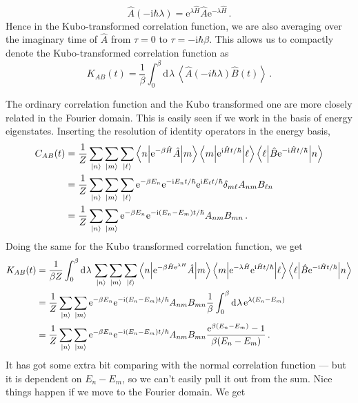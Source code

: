 \documentclass{article}
\theoremstyle{plain}\theoremheaderfont{\normalfont\itshape}\theorembodyfont{\rmfamily}\theoremseparator{.}\newtheorem*{rem}{Remark}\newtheorem*{ex}{Example}\newtheorem*{proof}{Proof}\newtheorem*{altp}{Alternative proof}
\theoremstyle{plain}\theoremheaderfont{\normalfont\bfseries}\theorembodyfont{\rmfamily}\theoremseparator{.}\newtheorem{thm}{Theorem}[section]\newtheorem{lem}[thm]{Lemma}\newtheorem{prop}[thm]{Proposition}\newtheorem*{cor}{Corollary}\newtheorem{defn}[thm]{Definition}\newtheorem{clm}[thm]{Claim}\newtheorem{clminproof}{Claim}
\theoremstyle{break}\theoremheaderfont{\normalfont\itshape}\theorembodyfont{\rmfamily}\theoremseparator{.\medskip}\newtheorem*{proofskip}{Proof}\newtheorem*{exs}{Examples}\newtheorem*{rems}{Remarks}
\theoremstyle{break}\theoremheaderfont{\normalfont\bfseries}\theorembodyfont{\rmfamily}\theoremseparator{.\medskip}\newtheorem{lemskip}[thm]{Lemma}\newtheorem{defnskip}[thm]{Definition}\newtheorem{propskip}[thm]{Proposition}\newtheorem{thmskip}[thm]{Theorem}
\numberwithin{equation}{section}
\newcommand{\ii}{\mathrm{i}}
\newcommand{\ee}{\mathrm{e}}
\newcommand{\dd}[2][]{\mathrm{d}^{#1} #2\,}
\newcommand{\ket}[1]{\left| #1 \right\rangle}
\newcommand{\mel}[3]{\left\langle #1 \middle| #2 \middle| #3 \right\rangle}
\newcommand{\eval}[1]{\left\langle #1 \right\rangle}
\begin{document}
    \begin{equation}
        \hat{A}(-\ii\hbar\lambda)=\ee^{\lambda\hat{H}}\hat{A}\ee^{-\lambda\hat{H}}\,.
    \end{equation}
    Hence in the Kubo-transformed correlation function, we are also averaging over the imaginary time of \(\hat{A}\) from \(\tau =0\) to \(\tau=-\ii\hbar\beta\). This allows us to compactly denote the Kubo-transformed correlation function as
    \begin{equation}
        K_{AB}(t)=\frac{1}{\beta}\int_{0}^{\beta}\dd{\lambda}\eval{\hat{A}(-i\hbar\lambda)\hat{B}(t)}\,.
    \end{equation}

    The ordinary correlation function and the Kubo transformed one are more closely related in the Fourier domain. This is easily seen if we work in the basis of energy eigenstates. Inserting the resolution of identity operators in the energy basis,
    \begin{align}
        C_{AB}(t)&=\frac{1}{Z}\sum_{\ket{n}}\sum_{\ket{m}}\sum_{\ket{\ell}}\mel{n}{\ee^{-\beta\hat{H}}\hat{A}}{m}\mel{m}{\ee^{\ii\hat{H}t/\hbar}}{\ell}\mel{\ell}{\hat{B}\ee^{-\ii\hat{H}t/\hbar}}{n}\notag \\
        &=\frac{1}{Z}\sum_{\ket{n}}\sum_{\ket{m}}\sum_{\ket{\ell}}\ee^{-\beta E_n}\ee^{-\ii E_n t/\hbar}\ee^{\ii E_\ell t/\hbar}\delta_{m\ell}A_{nm}B_{\ell n}\notag \\
        &=\frac{1}{Z}\sum_{\ket{n}}\sum_{\ket{m}}\ee^{-\beta E_n}\ee^{-\ii(E_n-E_m)t/\hbar}A_{nm}B_{mn}\,.
    \end{align}
    Doing the same for the Kubo transformed correlation function, we get
    \begin{align}
        K_{AB}(t)&=\frac{1}{\beta Z}\int_{0}^{\beta}\dd{\lambda}\sum_{\ket{n}}\sum_{\ket{m}}\sum_{\ket{\ell}}\mel{n}{\ee^{-\beta\hat{H}\ee^{\lambda H}}\hat{A}}{m}\mel{m}{\ee^{-\lambda\hat{H}}\ee^{\ii\hat{H}t/\hbar}}{\ell}\mel{\ell}{\hat{B}\ee^{-\ii\hat{H}t/\hbar}}{n}\notag \\
        &=\frac{1}{Z}\sum_{\ket{n}}\sum_{\ket{m}}\ee^{-\beta E_n}\ee^{-\ii(E_n-E_m)t/\hbar}A_{nm}B_{mn}\frac{1}{\beta}\int_{0}^{\beta}\dd{\lambda}\ee^{\lambda(E_n-E_m)}\notag\\
        &=\frac{1}{Z}\sum_{\ket{n}}\sum_{\ket{m}}\ee^{-\beta E_n}\ee^{-\ii(E_n-E_m)t/\hbar}A_{nm}B_{mn}\frac{\ee^{\beta(E_n-E_m)}-1}{\beta(E_n-E_m)}\,.
    \end{align}
    It has got some extra bit comparing with the normal correlation function --- but it is dependent on \(E_n-E_m\), so we can't easily pull it out from the sum. Nice things happen if we move to the Fourier domain. We get
\end{document}
